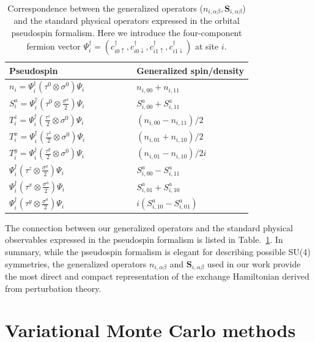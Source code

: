 \documentclass[reprint,superscriptaddress,amsmath,amssymb,aps,twocolumn]{revtex4-1}
\begin{document}
\begin{table}[h]
\centering
\renewcommand{\arraystretch}{1.3}
\caption{Correspondence between the generalized operators ($n_{i,\alpha\beta}, \mathbf{S}_{i,\alpha\beta}$) and the standard physical operators expressed in the orbital pseudospin formalism. Here we introduce the four-component fermion vector $\Psi_i^\dagger = (c_{i0\uparrow}^\dagger, c_{i0\downarrow}^\dagger, c_{i1\uparrow}^\dagger, c_{i1\downarrow}^\dagger)$ at site $i$.}
\label{tab:operator_correspondence}
\begin{tabular}{lll}
\hline
\hline
\textbf{Pseudospin} & $\qquad\qquad$ &  \textbf{Generalized spin/density} \\
\hline
$n_i=\Psi_i^\dagger (\tau^0 \otimes \sigma^0) \Psi_i$ & & $n_{i,00} + n_{i,11}$ \\
$S^a_i=\Psi_i^\dagger(\tau^0 \otimes \frac{\sigma^a}{2}) \Psi_i$ & & $S^a_{i,00} + S^a_{i,11}$ \\
$T_i^z=\Psi_i^\dagger(\frac{\tau^z}{2} \otimes \sigma^0)\Psi_i$ & &$\displaystyle (n_{i,00} - n_{i,11})/2$ \\
 $T_i^x=\Psi_i^\dagger(\frac{\tau^x}{2} \otimes \sigma^0)\Psi_i$ & &$(n_{i,01} + n_{i,10})/2$ \\
 $T_i^y=\Psi_i^\dagger(\frac{\tau^y}{2} \otimes \sigma^0)\Psi_i$ & &$(n_{i,01} - n_{i,10})/2i$ \\
 $\Psi_i^\dagger (\tau^z \otimes \frac{\sigma^a}{2}) \Psi_i$ & & $S^a_{i,00} - S^a_{i,11}$ \\
 $\Psi_i^\dagger (\tau^x \otimes \frac{\sigma^a}{2}) \Psi_i$ & & $S^a_{i,01} + S^a_{i,10}$ \\
 $\Psi_i^\dagger (\tau^y \otimes \frac{\sigma^a}{2}) \Psi_i$ & &$i(S^a_{i,10} - S^a_{i,01})$ \\
\hline
\hline
\end{tabular}
\end{table}


The connection between our generalized operators and the standard physical observables expressed in the pseudospin formalism is listed in Table.~\ref{tab:operator_correspondence}. 
In summary, while the pseudospin formalism is elegant for describing possible SU(4) symmetries, the generalized operators $n_{i,\alpha\beta}$ and $\mathbf{S}_{i,\alpha\beta}$ used in our work provide the most direct and compact representation of the exchange Hamiltonian derived from perturbation theory.


\section{Variational Monte Carlo methods}\label{methods}
\end{document}
